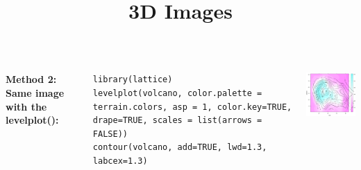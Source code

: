 \begin{frame}[fragile]
\title{3D Images}

    \begin{columns}
\bf{Method 2:} \normalfont Same image with the \ttfamily levelplot(): \normalfont 

\begin{lstlisting}
library(lattice)
levelplot(volcano, color.palette = terrain.colors, asp = 1, color.key=TRUE, drape=TRUE, scales = list(arrows = FALSE))
contour(volcano, add=TRUE, lwd=1.3, labcex=1.3)
\end{lstlisting}

       \begin{center}
\includegraphics[width = 55mm]{images/levelplot.png}
\end{center}
\end{columns}
\end{frame}

